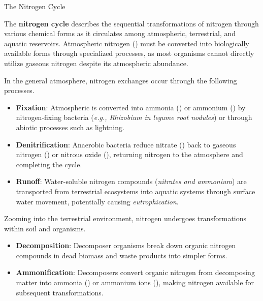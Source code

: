 \documentclass[10pt]{article}
\begin{document}
    \begin{core}{The Nitrogen Cycle}

      The \textbf{nitrogen cycle} describes the sequential transformations of nitrogen through various chemical forms as it circulates among atmospheric, terrestrial, and aquatic reservoirs. Atmospheric nitrogen () must be converted into biologically available forms through specialized processes, as most organisms cannot directly utilize gaseous nitrogen despite its atmospheric abundance.
      
      In the general atmosphere, nitrogen exchanges occur through the following processes.

      \begin{itemize}

        \item \textbf{Fixation}: Atmospheric  is converted into ammonia () or ammonium () by nitrogen-fixing bacteria (\textit{e.g., Rhizobium in legume root nodules}) or through abiotic processes such as lightning.

        \item \textbf{Denitrification}: Anaerobic bacteria reduce nitrate () back to gaseous nitrogen () or nitrous oxide (), returning nitrogen to the atmosphere and completing the cycle.

        \item \textbf{Runoff}: Water-soluble nitrogen compounds (\textit{nitrates and ammonium}) are transported from terrestrial ecosystems into aquatic systems through surface water movement, potentially causing \textit{eutrophication}.

      \end{itemize}
      
      Zooming into the terrestrial environment, nitrogen undergoes transformations within soil and organisms.

      \begin{itemize}

        \item \textbf{Decomposition}: Decomposer organisms break down organic nitrogen compounds in dead biomass and waste products into simpler forms.

        \item \textbf{Ammonification}: Decomposers convert organic nitrogen from decomposing matter into ammonia () or ammonium ions (), making nitrogen available for subsequent transformations.


\end{itemize}
\end{core}
\end{document}
